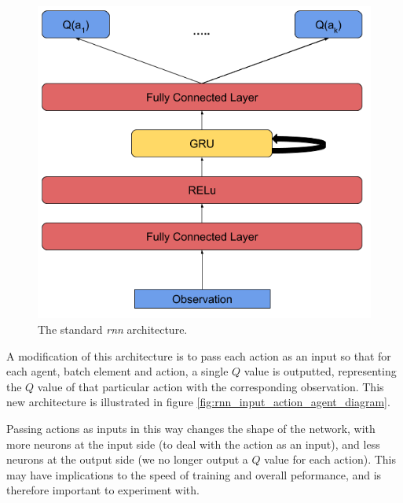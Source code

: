 \begin{figure}
    \centering
    \includegraphics[scale=0.3]{images/agent_diagrams/rnn_agent_diagram.png}
    \caption{The standard \textit{rnn} architecture.}
    \label{fig:rnn_agent_diagram}
\end{figure}


A modification of this architecture is to pass each action as an input so that for each agent, batch element and action, a single $Q$ value is outputted, representing the $Q$ value of that particular action with the corresponding observation. This new architecture is illustrated in figure \ref{fig:rnn_input_action_agent_diagram}.


Passing actions as inputs in this way changes the shape of the network, with more neurons at the input side (to deal with the action as an input), and less neurons at the output side (we no longer output a $Q$ value for each action). This may have implications to the speed of training and overall peformance, and is therefore important to experiment with.

